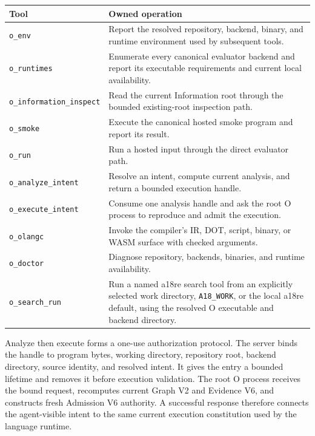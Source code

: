 \documentclass[11pt,oneside]{article}
\begin{document}
\begin{longtable}{P{0.25\textwidth} P{0.67\textwidth}}
\toprule
\textbf{Tool} & \textbf{Owned operation} \\
\midrule
\endhead
\texttt{o\_env} & Report the resolved repository, backend, binary, and runtime
environment used by subsequent tools. \\
\texttt{o\_runtimes} & Enumerate every canonical evaluator backend and report
its executable requirements and current local availability. \\
\texttt{o\_information\_inspect} & Read the current Information root through
the bounded existing-root inspection path. \\
\texttt{o\_smoke} & Execute the canonical hosted smoke program and report its
result. \\
\texttt{o\_run} & Run a hosted input through the direct evaluator path. \\
\texttt{o\_analyze\_intent} & Resolve an intent, compute current analysis,
and return a bounded execution handle. \\
\texttt{o\_execute\_intent} & Consume one analysis handle and ask the root O
process to reproduce and admit the execution. \\
\texttt{o\_olangc} & Invoke the compiler's IR, DOT, script, binary, or WASM
surface with checked arguments. \\
\texttt{o\_doctor} & Diagnose repository, backends, binaries, and runtime
availability. \\
\texttt{o\_search\_run} & Run a named a18re search tool from an explicitly
selected work directory, \texttt{A18\_WORK}, or the local a18re default, using
the resolved O executable and backend directory. \\
\bottomrule
\end{longtable}

Analyze then execute forms a one-use authorization protocol. The server binds
the handle to program bytes, working directory, repository root, backend
directory, source identity, and resolved intent. It gives the entry a bounded
lifetime and removes it before execution validation. The root O process
receives the bound request, recomputes current Graph V2 and Evidence V6, and
constructs fresh Admission V6 authority. A successful response therefore
connects the agent-visible intent to the same current execution constitution
used by the language runtime.
\end{document}
